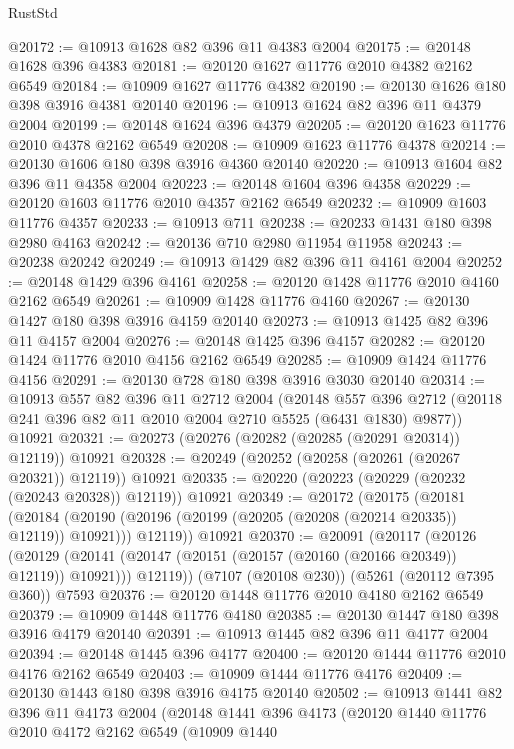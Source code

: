 \begin{lexlean}{RustStd}
\begin{coremodule}
@20172 := @10913 @1628 @82 @396 @11 @4383 @2004
@20175 := @20148 @1628 @396 @4383
@20181 := @20120 @1627 @11776 @2010 @4382 @2162 @6549
@20184 := @10909 @1627 @11776 @4382
@20190 := @20130 @1626 @180 @398 @3916 @4381 @20140
@20196 := @10913 @1624 @82 @396 @11 @4379 @2004
@20199 := @20148 @1624 @396 @4379
@20205 := @20120 @1623 @11776 @2010 @4378 @2162 @6549
@20208 := @10909 @1623 @11776 @4378
@20214 := @20130 @1606 @180 @398 @3916 @4360 @20140
@20220 := @10913 @1604 @82 @396 @11 @4358 @2004
@20223 := @20148 @1604 @396 @4358
@20229 := @20120 @1603 @11776 @2010 @4357 @2162 @6549
@20232 := @10909 @1603 @11776 @4357
@20233 := @10913 @711
@20238 := @20233 @1431 @180 @398 @2980 @4163
@20242 := @20136 @710 @2980 @11954 @11958
@20243 := @20238 @20242
@20249 := @10913 @1429 @82 @396 @11 @4161 @2004
@20252 := @20148 @1429 @396 @4161
@20258 := @20120 @1428 @11776 @2010 @4160 @2162 @6549
@20261 := @10909 @1428 @11776 @4160
@20267 := @20130 @1427 @180 @398 @3916 @4159 @20140
@20273 := @10913 @1425 @82 @396 @11 @4157 @2004
@20276 := @20148 @1425 @396 @4157
@20282 := @20120 @1424 @11776 @2010 @4156 @2162 @6549
@20285 := @10909 @1424 @11776 @4156
@20291 := @20130 @728 @180 @398 @3916 @3030 @20140
@20314 := @10913
    @557
    @82
    @396
    @11
    @2712
    @2004
    (@20148 @557 @396 @2712 (@20118 @241 @396 @82 @11 @2010 @2004 @2710 @5525 (@6431 @1830) @9877))
    @10921
@20321 := @20273 (@20276 (@20282 (@20285 (@20291 @20314)) @12119)) @10921
@20328 := @20249 (@20252 (@20258 (@20261 (@20267 @20321)) @12119)) @10921
@20335 := @20220 (@20223 (@20229 (@20232 (@20243 @20328)) @12119)) @10921
@20349 := @20172
    (@20175
      (@20181
        (@20184 (@20190 (@20196 (@20199 (@20205 (@20208 (@20214 @20335)) @12119)) @10921)))
        @12119))
    @10921
@20370 := @20091
    (@20117
      (@20126
        (@20129 (@20141 (@20147 (@20151 (@20157 (@20160 (@20166 @20349)) @12119)) @10921)))
        @12119))
    (@7107 (@20108 @230))
    (@5261 (@20112 @7395 @360))
    @7593
@20376 := @20120 @1448 @11776 @2010 @4180 @2162 @6549
@20379 := @10909 @1448 @11776 @4180
@20385 := @20130 @1447 @180 @398 @3916 @4179 @20140
@20391 := @10913 @1445 @82 @396 @11 @4177 @2004
@20394 := @20148 @1445 @396 @4177
@20400 := @20120 @1444 @11776 @2010 @4176 @2162 @6549
@20403 := @10909 @1444 @11776 @4176
@20409 := @20130 @1443 @180 @398 @3916 @4175 @20140
@20502 := @10913
    @1441
    @82
    @396
    @11
    @4173
    @2004
    (@20148
      @1441
      @396
      @4173
      (@20120
        @1440
        @11776
        @2010
        @4172
        @2162
        @6549
        (@10909
          @1440

\end{coremodule}
\end{lexlean}
